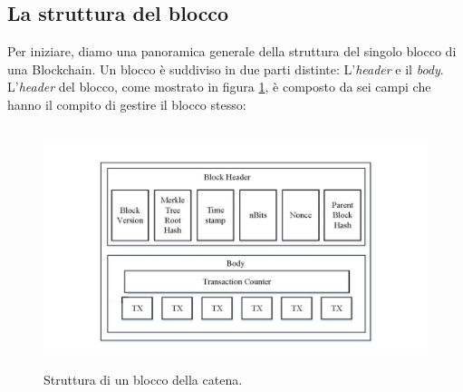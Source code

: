 \subsection{La struttura del blocco}\label{struttura_blocco}
Per iniziare, diamo una panoramica generale della struttura del singolo blocco di una Blockchain.
Un blocco è suddiviso in due parti distinte: L'\textit{header} e il \textit{body}.
L'\textit{header} del blocco, come mostrato in figura \ref{struttura_blocco_img}, è composto da sei campi che hanno il compito di gestire il blocco stesso:
\begin{figure}[h]
    \centering
    \includegraphics[width=14cm,height=7cm]{Immagini/Struttura_blocco.png}
    \caption[Struttura di un blocco della catena]{Struttura di un blocco della catena.}
    \label{struttura_blocco_img}
\end{figure}
